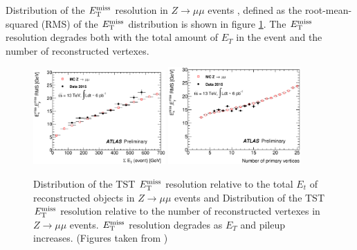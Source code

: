 \indent Distribution of the $E_{\mathrm{T}}^{\mathrm{miss}}$ resolution in $Z\rightarrow \mu\mu$ events , defined as the root-mean-squared (RMS) of the $E_{\mathrm{T}}^{\mathrm{miss}}$ distribution is shown in figure \ref{fig:MET_reso}.  The $E_{\mathrm{T}}^{\mathrm{miss}}$ resolution degrades both with the total amount of $E_T$ in the event and the number of reconstructed vertexes.\\

\begin{figure}[htb]
  \begin{center}
    \includegraphics[width=0.45\textwidth]{figures/METCalib/METReso_Et.eps}\hspace{0.05\textwidth}
    \includegraphics[width=0.45\textwidth]{figures/METCalib/METReso_nVtx.eps}\hspace{0.05\textwidth}
\end{center}
\caption{Distribution of the TST $E_{\mathrm{T}}^{\mathrm{miss}}$ resolution relative to the total $E_t$ of reconstructed objects in $Z\rightarrow \mu\mu$ events and Distribution of the TST $E_{\mathrm{T}}^{\mathrm{miss}}$ resolution relative to the number of reconstructed vertexes in $Z\rightarrow \mu\mu$ events.  $E_{\mathrm{T}}^{\mathrm{miss}}$ resolution degrades as $E_T$ and pileup increases.  (Figures taken from \cite{METReco})}
\label{fig:MET_reso} 
\end{figure}






